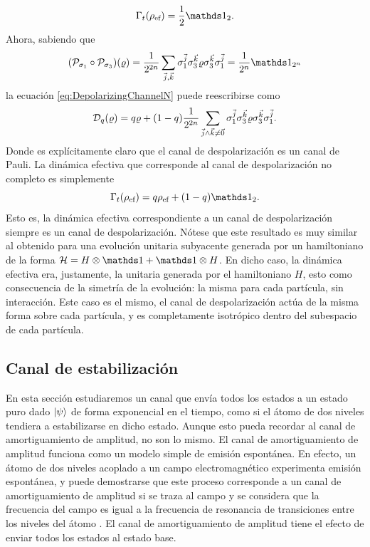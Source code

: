 \begin{equation}
    \Gamma_{t}(\rho_{\ef})=\frac{1}{2}\Id_{2}.
\end{equation}
Ahora, sabiendo que
\begin{equation}
    \qty(\mcP_{\pauli{1}}\circ \mcP_{\pauli{3}})(\varrho)=\frac{1}{2^{2n}}\sum_{\vec{j},\vec{k}}\pauli{1}^{\vec{j}}\pauli{3}^{\vec{k}}\varrho\pauli{3}^{\vec{k}}\pauli{1}^{\vec{j}}=\frac{1}{2^{n}}\Id_{2^{n}}\nonumber
\end{equation}
la ecuación \ref{eq:DepolarizingChannelN} puede reescribirse como
\begin{equation}
    \mathcal{D}_{q}(\varrho)=q\varrho+(1-q)\frac{1}{2^{2n}}\sum_{\vec{j}\land\vec{k}\neq\vec{0}}\sigma_{1}^{\vec{j}}\sigma_{3}^{\vec{k}}\varrho\sigma_{3}^{\vec{k}}\sigma_{1}^{\vec{j}}.\nonumber
\end{equation}
Donde es explícitamente claro que el canal de despolarización es un canal de Pauli. La dinámica efectiva que corresponde al canal de despolarización no completo es simplemente
\begin{equation}\label{eq:EffectiveDepolarizing}
    \Gamma_{t}(\rho_{\ef})=q\rho_{\ef}+(1-q)\Id_{2}.
\end{equation}
Esto es, la dinámica efectiva correspondiente a un canal de despolarización siempre es un canal de despolarización. Nótese que este resultado es muy similar al obtenido para una evolución unitaria subyacente generada por un hamiltoniano de la forma $\mcH=H\otimes\Id+\Id\otimes H$. En dicho caso, la dinámica efectiva era, justamente, la unitaria generada por el hamiltoniano $H$, esto como consecuencia de la simetría de la evolución: la misma para cada partícula, sin interacción. Este caso es el mismo, el canal de despolarización actúa de la misma forma sobre cada partícula, y es completamente isotrópico dentro del subespacio de cada partícula.

\subsection{Canal de estabilización}

En esta sección estudiaremos un canal que envía todos los estados a un estado puro dado $\ket{\psi}$ de forma exponencial en el tiempo, como si el átomo de dos niveles tendiera a estabilizarse en dicho estado. Aunque esto pueda recordar al canal de amortiguamiento de amplitud, no son lo mismo. El canal de amortiguamiento de amplitud funciona como un modelo simple de emisión espontánea. En efecto, un átomo de dos niveles acoplado a un campo electromagnético experimenta emisión espontánea, y puede demostrarse que este proceso corresponde a un canal de amortiguamiento de amplitud si se traza al campo y se considera que la frecuencia del campo es igual a la frecuencia de resonancia de transiciones entre los niveles del átomo \cite{Fox}. El canal de amortiguamiento de amplitud tiene el efecto de enviar todos los estados al estado base.

